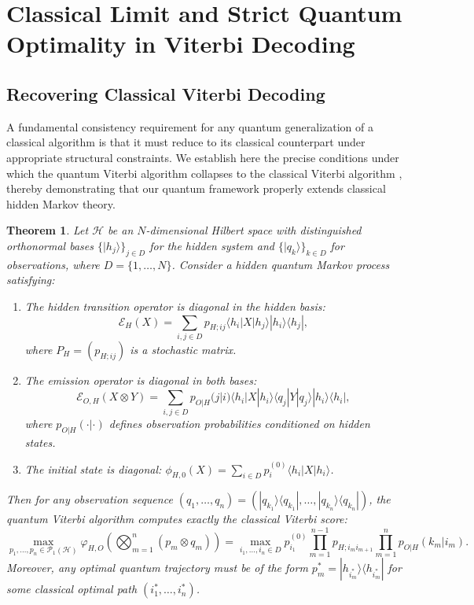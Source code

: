 \documentclass[12pt, reco]{article}
\newtheorem{theorem}{Theorem}[section]
\begin{document}
\section{Classical Limit and Strict Quantum Optimality in Viterbi Decoding}\label{Sect_Class}

\subsection{Recovering Classical Viterbi Decoding}
 
A fundamental consistency requirement for any quantum generalization of a classical algorithm is that it must reduce to its classical counterpart under appropriate structural constraints. We establish here the precise conditions under which the quantum Viterbi algorithm collapses to the classical Viterbi algorithm \cite{V03, Rab2002}, thereby demonstrating that our quantum framework properly extends classical hidden Markov theory.

\begin{theorem}\label{thm:quantum-classical-reduction}
Let $\mathcal{H}$ be an $N$-dimensional Hilbert space with distinguished orthonormal bases $\{|h_j\rangle\}_{j\in D}$ for the hidden system and $\{|q_k\rangle\}_{k\in D}$ for observations, where $D = \{1,\dots,N\}$. Consider a hidden quantum Markov process satisfying:
\begin{enumerate}
    \item The hidden transition operator is diagonal in the hidden basis:
    \[
    \mathcal{E}_H(X) = \sum_{i,j\in D} p_{H;ij} \langle h_i|X|h_j\rangle |h_i\rangle\langle h_j|,
    \]
    where $P_H = (p_{H;ij})$ is a stochastic matrix.

    \item The emission operator is diagonal in both bases:
    \[
    \mathcal{E}_{O,H}(X\otimes Y) = \sum_{i,j\in D} p_{O|H}(j|i) \langle h_i|X|h_i\rangle \langle q_j|Y|q_j\rangle |h_i\rangle\langle h_i|,
    \]
    where $p_{O|H}(\cdot|\cdot)$ defines observation probabilities conditioned on hidden states.

    \item The initial state is diagonal: $\phi_{H,0}(X) = \sum_{i\in D} p^{(0)}_i \langle h_i|X|h_i\rangle$.
\end{enumerate}
Then for any observation sequence $(q_1,\dots,q_n) = (|q_{k_1}\rangle\langle q_{k_1}|, \dots, |q_{k_n}\rangle\langle q_{k_n}|)$, the quantum Viterbi algorithm computes exactly the classical Viterbi score:
\[
\max_{p_1,\dots,p_n \in \mathcal{P}_1(\mathcal{H})} \varphi_{H,O}\!\left(\bigotimes_{m=1}^n (p_m \otimes q_m)\right)
= \max_{i_1,\dots,i_n \in D} p^{(0)}_{i_1} \prod_{m=1}^{n-1} p_{H;i_m i_{m+1}} \prod_{m=1}^n p_{O|H}(k_m|i_m).
\]
Moreover, any optimal quantum trajectory must be of the form $p_m^* = |h_{i_m^*}\rangle\langle h_{i_m^*}|$ for some classical optimal path $(i_1^*,\dots,i_n^*)$.
\end{theorem}
\end{document}
